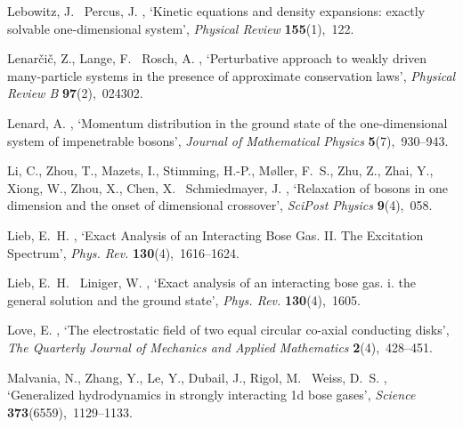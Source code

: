 \documentclass[onecolumn,amsfonts,showpacs,superscriptaddress]{revtex4-1}
\begin{document}
\begin{thebibliography}{xx}
Lebowitz, J. \harvardand\ Percus, J.  \harvardyearright ,
  `Kinetic equations and density expansions: exactly solvable one-dimensional
  system', {\em Physical Review} {\bf 155}(1),~122.

Lenar{\v{c}}i{\v{c}}, Z., Lange, F. \harvardand\ Rosch, A.  \harvardyearright , `Perturbative approach to weakly driven many-particle
  systems in the presence of approximate conservation laws', {\em Physical
  Review B} {\bf 97}(2),~024302.

Lenard, A.  \harvardyearright , `Momentum distribution in
  the ground state of the one-dimensional system of impenetrable bosons', {\em
  Journal of Mathematical Physics} {\bf 5}(7),~930--943.

Li, C., Zhou, T., Mazets, I., Stimming, H.-P., Møller, F.~S., Zhu, Z., Zhai,
  Y., Xiong, W., Zhou, X., Chen, X. \harvardand\ Schmiedmayer, J.
  \harvardyearright , `Relaxation of bosons in one
  dimension and the onset of dimensional crossover', {\em SciPost Physics} {\bf
  9}(4),~058.

Lieb, E.~H.  \harvardyearright , `Exact {Analysis} of an
  {Interacting} {Bose} {Gas}. {II}. {The} {Excitation} {Spectrum}', {\em Phys.
  Rev.} {\bf 130}(4),~1616--1624.

Lieb, E.~H. \harvardand\ Liniger, W.  \harvardyearright ,
  `Exact analysis of an interacting bose gas. i. the general solution and the
  ground state', {\em Phys. Rev.} {\bf 130}(4),~1605.

Love, E.  \harvardyearright , `The electrostatic field of
  two equal circular co-axial conducting disks', {\em The Quarterly Journal of
  Mechanics and Applied Mathematics} {\bf 2}(4),~428--451.

Malvania, N., Zhang, Y., Le, Y., Dubail, J., Rigol, M. \harvardand\ Weiss,
  D.~S.  \harvardyearleft 2021\harvardyearright , `Generalized hydrodynamics in
  strongly interacting 1d bose gases', {\em Science} {\bf
  373}(6559),~1129--1133.


\end{thebibliography}
\end{document}
